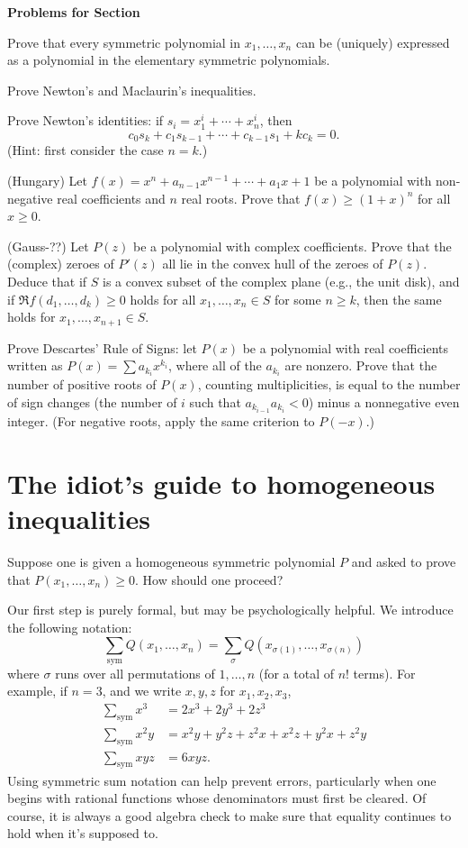 \documentclass[12pt]{report}
\def\ii{\item}
\def\ssym{\sum_{\mathrm{sym}}}
\newcounter{exc}
\numberwithin{exc}{section}
\newenvironment{exer}{\vspace{0.1in}
\noindent \textbf{Problems for Section~\thesection} \vspace{0.1in}
\begin{list}{\arabic{exc}.}{\usecounter{exc}}}{\end{list}}
\begin{document}
\begin{exer}
\ii
Prove that every symmetric polynomial in $x_{1}, \dots, x_{n}$
can be (uniquely) expressed as a 
polynomial in the elementary symmetric polynomials.
\ii
Prove Newton's and Maclaurin's inequalities.
\ii
Prove Newton's identities: if $s_{i} = x_{1}^{i} + \cdots + 
x_{n}^{i}$, then
\[
c_{0} s_{k} + c_{1} s_{k-1} + \cdots + c_{k-1} s_{1} + k c_{k} = 0.
\]
(Hint: first consider the case $n=k$.)
\ii (Hungary) Let $f(x)=x^n+a_{n-1}x^{n-1}+\cdots +a_1x+1$ be a
polynomial  with non-negative real coefficients and $n$ real roots. 
 Prove that $f(x) \geq (1+x)^n$ for all $x\geq 0$.
\ii (Gauss-??)
Let $P(z)$ be a polynomial with complex coefficients. Prove that the 
(complex) zeroes of $P'(z)$ all lie in the convex hull of the zeroes 
of $P(z)$. Deduce that if $S$ is a convex subset of 
the complex plane (e.g., the unit disk), and if $\Re f(d_{1}, \dots, 
d_{k}) \geq 0$ holds for all $x_{1}, \dots, x_{n} \in S$ for some $n 
\geq k$, then the same holds for $x_{1}, \dots, x_{n+1} \in S$.
\ii
Prove Descartes' Rule of Signs: let $P(x)$ be a polynomial with real 
coefficients written as
$P(x) = \sum a_{k_{i}} x^{k_{i}}$, where all of the $a_{k_{i}}$ are nonzero. 
Prove that the number of positive roots of $P(x)$, counting
multiplicities, is equal to the 
number of sign changes (the number of $i$ such that 
$a_{k_{i-1}}a_{k_{i}} < 0$) minus a nonnegative even integer. (For 
negative roots, apply the same criterion to $P(-x)$.)
\end{exer}

\section{The idiot's guide to homogeneous inequalities}
Suppose one is given a homogeneous symmetric polynomial $P$ and asked 
to prove that $P(x_{1}, \dots, x_{n}) \geq 0$. How should one proceed?

Our first step is purely formal, but may be psychologically helpful. We 
introduce the following notation:
\[
\ssym Q(x_{1}, \dots, x_{n}) = \sum_{\sigma}
Q(x_{\sigma(1)}, \dots, x_{\sigma(n)})
\]
where $\sigma$ runs over all permutations of $1, \dots, n$ (for a 
total of $n!$ terms).
For example, if $n = 3$, and we write $x,y,z$ for $x_{1}, x_{2}, 
x_{3}$,
\begin{align*}
\ssym x^{3} &= 2x^{3} + 2y^{3} + 2z^{3} \\
\ssym x^{2}y &= x^{2}y + y^{2}z + z^{2}x + x^{2}z + y^{2}x + z^{2}y \\
\ssym xyz &= 6xyz.
\end{align*}
Using symmetric sum notation can help prevent errors, particularly 
when one begins with rational functions whose denominators must first 
be cleared. Of course, it is always a good algebra check to make sure that 
equality continues to hold when it's supposed to.
\end{document}
